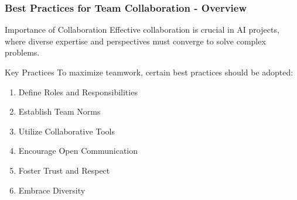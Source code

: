 \documentclass[aspectratio=169]{beamer}
\begin{document}
\begin{frame}[fragile]
    \frametitle{Best Practices for Team Collaboration - Overview}
    \begin{block}{Importance of Collaboration}
        Effective collaboration is crucial in AI projects, where diverse expertise and perspectives must converge to solve complex problems. 
    \end{block}
    
    \begin{block}{Key Practices}
        To maximize teamwork, certain best practices should be adopted:
        \begin{enumerate}
            \item Define Roles and Responsibilities
            \item Establish Team Norms
            \item Utilize Collaborative Tools
            \item Encourage Open Communication
            \item Foster Trust and Respect
            \item Embrace Diversity
        \end{enumerate}
    \end{block}
\end{frame}
\end{document}
